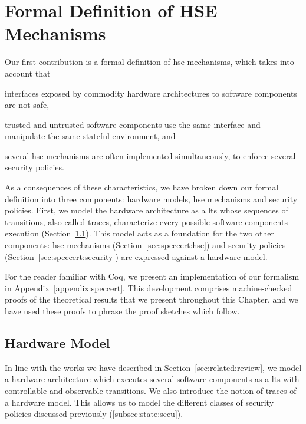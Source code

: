 \chapter{Formal Definition of HSE Mechanisms}
\label{chapter:speccert}


\vspace{1cm}\noindent
%
Our first contribution is a formal definition of \ac{hse} mechanisms, which
takes into account that
%
\begin{inparaenum}[(1)]
\item interfaces exposed by commodity hardware architectures to software
  components are not safe,
\item trusted and untrusted software components use the same interface and
  manipulate the same stateful environment, and
\item several \ac{hse} mechanisms are often implemented simultaneously, to
  enforce several security policies.
\end{inparaenum}
%
As a consequences of these characteristics, we have broken down our formal
definition into three components: hardware models, \ac{hse} mechanisms and
security policies.
%
First, we model the hardware architecture as a \ac{lts} whose sequences of
transitions, also called traces, characterize every possible software components
execution (Section~\ref{sec:speccert:hardware}).
%
This model acts as a foundation for the two other components: \ac{hse}
mechanisms (Section~\ref{sec:speccert:hse}) and security policies
(Section~\ref{sec:speccert:security}) are expressed against a hardware model.

For the reader familiar with Coq, we present an implementation of our formalism
in Appendix~\ref{appendix:speccert}.
%
This development comprises machine-checked proofs of the theoretical results
that we present throughout this Chapter, and we have used these proofs to phrase
the proof sketches which follow.

\section{Hardware Model}
\label{sec:speccert:hardware}

In line with the works we have described in Section~\ref{sec:related:review}, we
model a hardware architecture which executes several software components as a
\ac{lts} with controllable and observable transitions.
%
We also introduce the notion of traces of a hardware model.
%
This allows us to model the different classes of security policies discussed
previously (\ref{subsec:state:secu}).

